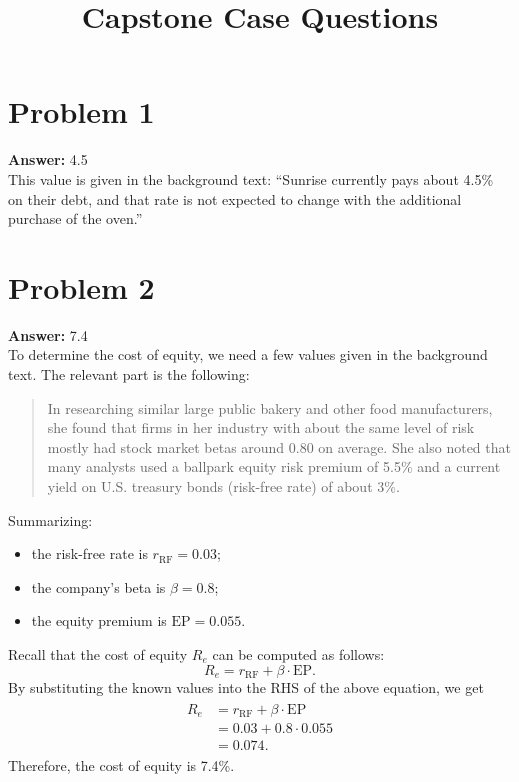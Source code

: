 \documentclass[11pt]{article}
\date{}
\title{Capstone Case Questions}
\begin{document}
\thispagestyle{empty}
\pagestyle{empty}
\section*{Problem 1}
\label{sec:orgbb9a91a}

\textbf{Answer:} 4.5\\

This value is given in the background text: ``Sunrise currently pays about 4.5\%
on their debt, and that rate is not expected to change with the additional
purchase of the oven.''
\section*{Problem 2}
\label{sec:org6e30586}

\textbf{Answer:} 7.4\\

To determine the cost of equity, we need a few values given in the background
text. The relevant part is the following:
\begin{quote}
In researching similar large public bakery and other food manufacturers, she
found that firms in her industry with about the same level of risk mostly had
stock market betas around 0.80 on average. She also noted that many analysts
used a ballpark equity risk premium of 5.5\% and a current yield on U.S. treasury
bonds (risk-free rate) of about 3\%.
\end{quote}
Summarizing:
\begin{itemize}
\item the risk-free rate is \(r_{\mathrm{RF}}=0.03\);
\item the company's beta is \(\beta=0.8\);
\item the equity premium is \(\mathrm{EP}=0.055\).
\end{itemize}
Recall that the cost of equity \(R_e\) can be computed as follows:
\begin{equation}
R_e=r_{\mathrm{RF}}+\beta\cdot\mathrm{EP}.
\end{equation}
By substituting the known values into the RHS of the above equation, we get
\begin{align}
  \begin{split}
    R_e&=r_{\mathrm{RF}}+\beta\cdot\mathrm{EP}\\
    &=0.03+0.8\cdot 0.055\\
    &=0.074.
  \end{split}
\end{align}
Therefore, the cost of equity is 7.4\%.
\end{document}

